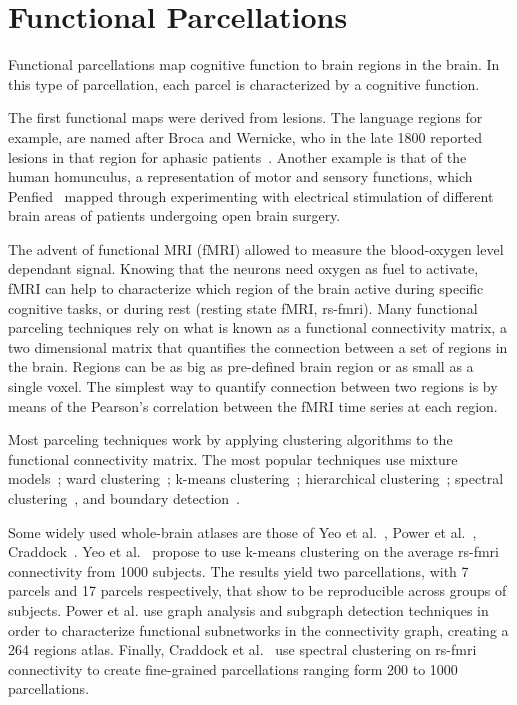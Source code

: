 \section{Functional Parcellations}
\label{sec:functional}
Functional parcellations map cognitive function to brain regions in the brain.
In this type of parcellation, each parcel is characterized by a cognitive function.

The first functional maps were derived from lesions. The language regions for
example, are named after Broca and Wernicke, who in the late 1800 reported
lesions in that region for aphasic patients~\cite{Johns}. Another example is
that of the human homunculus, a representation of motor and sensory functions,
which Penfied~\cite{Schleicher1990} mapped through experimenting with electrical
stimulation of different brain areas of patients undergoing open brain surgery.

The advent of functional MRI (fMRI) allowed to measure the blood-oxygen level
dependant signal. Knowing that the neurons need oxygen as fuel to activate,
fMRI can help to characterize which region of the brain active during specific
cognitive tasks, or during rest (resting state fMRI, rs-fmri). Many functional parceling
techniques rely on what is known as a functional connectivity matrix, a two
dimensional matrix that quantifies the connection between a set of regions
in the brain. Regions can be as big as pre-defined brain region or as small as
a single voxel. The simplest way to quantify connection between two regions is
by means of the Pearson's correlation between the fMRI time series at each region.

Most parceling techniques work by applying clustering algorithms to the
functional connectivity matrix. The most popular techniques use 
mixture models~\cite{Lashkari2010, Ryali2012}; ward clustering~\cite{Blumensath2013};
k-means clustering~\cite{Yeo2011, Shen2013, Kahnt2012}; hierarchical clustering~\cite{Eickhoff2011, Michel2011};
spectral clustering~\cite{Thirion2006, Craddock2011, Schaefer2017}, and
boundary detection~\cite{Gordon2016, Wig2014, Schaefer2017}.

Some widely used whole-brain atlases are those of Yeo et al.~\cite{Yeo2011},
Power et al.~\cite{Power2011}, Craddock~\cite{Craddock2011}. 
Yeo et al.~\cite{Yeo2011} propose to use k-means clustering on the average
rs-fmri connectivity from 1000 subjects. The results yield two parcellations,
with 7 parcels and 17 parcels respectively, that show to be reproducible across
groups of subjects. Power et al.\cite{Power2011} use graph analysis and subgraph
detection techniques in order to characterize functional subnetworks in the
connectivity graph, creating a 264 regions atlas. Finally, Craddock et al.~\cite{Craddock2011}
use spectral clustering on rs-fmri connectivity to create fine-grained parcellations
ranging form 200 to 1000 parcellations.

